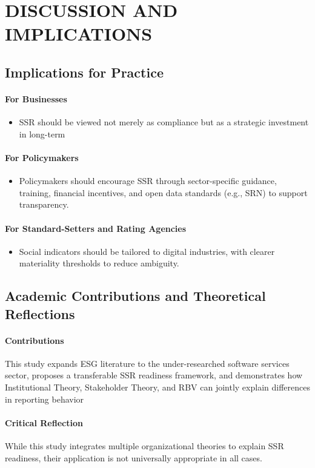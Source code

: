\chapter{DISCUSSION AND IMPLICATIONS}


\section{Implications for Practice}
\subsubsection{For Businesses}
\begin{itemize}
    \item SSR should be viewed not merely as compliance but as a strategic investment in long-term
\end{itemize}

\subsubsection{For Policymakers}
\begin{itemize}
    \item Policymakers should encourage SSR through sector-specific guidance, training, financial incentives, 
    and open data standards (e.g., SRN) to support transparency.
\end{itemize}

\subsubsection{For Standard-Setters and Rating Agencies}
\begin{itemize}
    \item Social indicators should be tailored to digital industries,
    with clearer materiality thresholds to reduce ambiguity.
\end{itemize}

\section{Academic Contributions and Theoretical Reflections}
\subsubsection{Contributions}
This study expands ESG literature to the under-researched software services sector, 
proposes a transferable SSR readiness framework, and demonstrates how 
Institutional Theory, Stakeholder Theory, and RBV can jointly explain differences in reporting behavior

\subsubsection{Critical Reflection}
While this study integrates multiple organizational theories to explain SSR readiness, 
their application is not universally appropriate in all cases.
